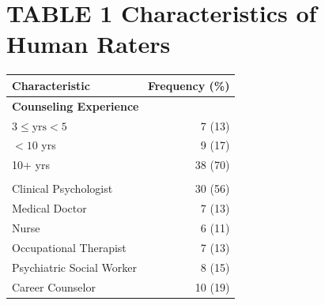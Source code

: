 \documentclass{wiley-article}
\begin{document}
\begin{table}[htbp]
  \section*{TABLE 1 Characteristics of Human Raters}
  \centering
  \label{tab:human_rater_characteristics}
  \begin{tabular}{l r}
    \toprule
    \textbf{Characteristic} & \textbf{Frequency (\%)}\\
    \midrule
    \multicolumn{2}{l}{\textbf{Counseling Experience}}\\
    $3 \le \text{yrs} < 5$ & 7 (13)\\
    $< 10$ yrs             & 9 (17)\\
    10+ yrs                & 38 (70)\\
    \addlinespace
    \multicolumn{2}{l}{\textbf{Certificate}}\\
    Clinical Psychologist      & 30 (56)\\
    Medical Doctor             & 7 (13)\\
    Nurse                      & 6 (11)\\
    Occupational Therapist     & 7 (13)\\
    Psychiatric Social Worker  & 8 (15)\\
    Career Counselor           & 10 (19)\\
    \bottomrule
  \end{tabular}
\end{table}
\end{document}
